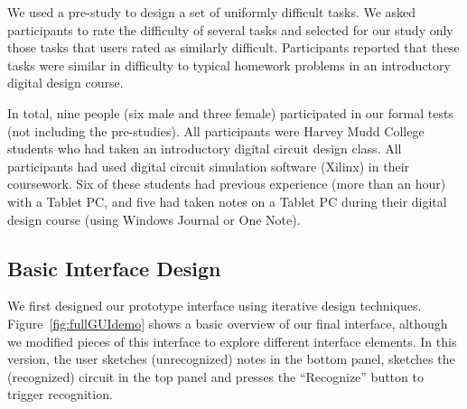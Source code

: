 \documentclass{egpubl}
\begin{document}


We used a pre-study to design a set of uniformly difficult tasks.  We
asked participants to rate the difficulty of several tasks and
selected for our study only those tasks that users rated as similarly
difficult.  Participants reported that these tasks were similar in
difficulty to typical homework problems in an introductory digital
design course.


In total, nine people (six male and three female) participated in our
formal tests (not including the pre-studies). All participants were
Harvey Mudd College students who had taken an introductory digital
circuit design class.  All participants had used digital circuit
simulation software (Xilinx) in their coursework.  Six of these
students had previous experience (more than an hour) with a Tablet PC,
and five had taken notes on a Tablet PC during their digital design
course (using Windows Journal or One Note).

\subsection{Basic Interface Design}
We first designed our prototype interface using iterative design
techniques.  Figure~\ref{fig:fullGUIdemo} shows a basic overview of
our final interface, although we modified pieces of this interface to
explore different interface elements.  In this version, the user
sketches (unrecognized) notes in the bottom panel, sketches the
(recognized) circuit in the top panel and presses the ``Recognize''
button to trigger recognition.
\end{document}
